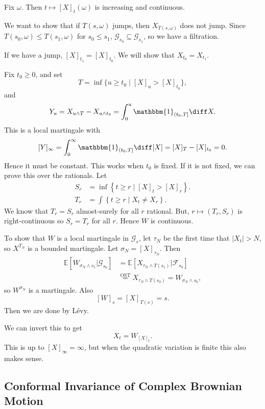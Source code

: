 \documentclass[12pt]{article}
\begin{document}
\begin{proofbox}
	Fix $\omega$. Then $t \mapsto [X]_t(\omega)$ is increasing and continuous.

	We want to show that if $T(s, \omega)$ jumps, then $X_{T(s, \omega)}$ does not jump. Since $T(s_0, \omega) \leq T(s_1, \omega)$ for $s_0 \leq s_1$, $\mathcal{G}_{s_0} \subseteq \mathcal{G}_{s_1}$, so we have a filtration.

	If we have a jump, $[X]_{t_1} = [X]_{t_0}$. We will show that $X_{t_0} = X_{t_1}$.

	Fix $t_0 \geq0$, and set
	\[
		T = \inf\{ u \geq t_0 \mid [X]_u > [X]_{t_0}\},
	\]
	and
	\[
		Y_u = X_{u \wedge T} - X_{u \wedge t_0} = \int_0^{u} \mathbbm{1}_{(t_0, T]} \diff X.
	\]
	This is a local martingale with
	\[
		[Y]_\infty = \int_0^{\infty} \mathbbm{1}_{(t_0, T]} \diff [X] = [X]_T - [X]_{t_0} = 0.
	\]
	Hence it must be constant. This works when $t_0$ is fixed. If it is not fixed, we can prove this over the rationals. Let
	\begin{align*}
		S_r &= \inf \left\{ t \geq r \mid [X]_t > [X]_r \right\}. \\
		T_r &= \int \left\{ t \geq r \mid X_t \neq X_r \right\}.
	\end{align*}
	We know that $T_r = S_r$ almost-surely for all $r$ rational. But, $r \mapsto  (T_r, S_r)$ is right-continuous so $S_r = T_r$ for all $r$. Hence $W$ is continuous.

	To show that $W$ is a local martingale in $\mathcal{G}_s$, let $\tau_N$ be the first time that $|X_t| > N$, so $X^{T_N}$ is a bounded martingale. Let $\sigma_N = [X]_{\tau_N}$. Then
	\begin{align*}
		\mathbb{E}[W_{\sigma_N \wedge s_1} | \mathcal{G}_{s_0}] &= \mathbb{E}[X_{\tau_N \wedge T(s_1)} | \mathcal{F}_{s_0}] \\
								       &\overset{\text{OST}}= X_{\tau_N \wedge T(s_0)} = W_{\sigma_N \wedge s_0},
	\end{align*}
	so $W^{\sigma_N}$ is a martingale. Also
	\[
		[W]_s = [X]_{T(s)} = s.
	\]
	Then we are done by L\'evy.
\end{proofbox}


We can invert this to get
\[
	X_t = W_{[X]_t}.
\]
This is up to $[X]_\infty = \infty$, but when the quadratic variation is finite this also makes sense.

\subsection{Conformal Invariance of Complex Brownian Motion}%
\label{sub:ci}
\end{document}
